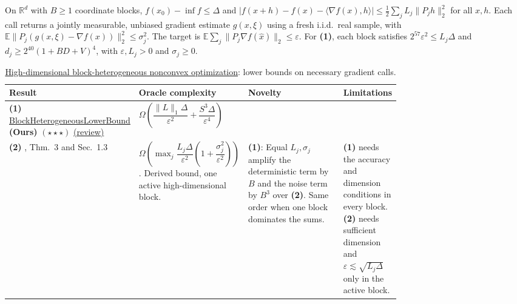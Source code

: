 \begin{table}[tp]
\centering
\caption{\href{https://github.com/k3nfalt/longtails/blob/main/LongTails/Setups/HighDimensionalBlockHeterogeneousNonconvex.lean}{High-dimensional block-heterogeneous nonconvex optimization}: lower bounds on necessary gradient calls.}\label{tab:HighDimensionalBlockHeterogeneousNonconvex}
\parbox{\linewidth}{\footnotesize On $\mathbb R^d$ with $B\ge1$ coordinate blocks, $f(x_0)-\inf f\le\Delta$ and $|f(x+h)-f(x)-\langle\nabla f(x),h\rangle|\le\frac12\sum_j L_j\|P_jh\|_2^2$ for all $x,h$. Each call returns a jointly measurable, unbiased gradient estimate $g(x,\xi)$ using a fresh i.i.d.\ real sample, with $\mathbb E\|P_j(g(x,\xi)-\nabla f(x))\|_2^2\le\sigma_j^2$. The target is $\mathbb E\sum_j\|P_j\nabla f(\hat x)\|_2\le\varepsilon$. For \textbf{(1)}, each block satisfies $2^{57}\varepsilon^2\le L_j\Delta$ and $d_j\ge2^{40}(1+BD+V)^4$, with $\varepsilon,L_j>0$ and $\sigma_j\ge0$.}\par\smallskip
\begin{threeparttable}
\footnotesize
\setlength{\tabcolsep}{4pt}\renewcommand{\arraystretch}{1.25}
\begin{tabularx}{\linewidth}{@{}>{\raggedright\arraybackslash}p{0.20\linewidth}>{\raggedright\arraybackslash}p{0.26\linewidth}>{\raggedright\arraybackslash}p{0.29\linewidth}>{\raggedright\arraybackslash}X@{}}
\toprule
\textbf{Result} & \textbf{Oracle complexity} & \textbf{Novelty} & \textbf{Limitations} \\
\midrule
\textbf{(1)} \href{https://github.com/k3nfalt/longtails/blob/main/LongTails/Theorems/BlockHeterogeneousLowerBound.lean}{Block\allowbreak Heterogeneous\allowbreak Lower\allowbreak Bound} \textbf{(Ours)} $(\star\star\star)$ \href{https://github.com/k3nfalt/longtails/blob/main/scripts/reviews/BlockHeterogeneousLowerBound.md}{(review)}
& $\Omega\!\left(\dfrac{\|L\|_1\Delta}{\varepsilon^2}+\dfrac{S^3\Delta}{\varepsilon^4}\right)$ & & \\
\midrule[1.2pt]
\textbf{(2)} \citep{hdabcArjevaniV2}, Thm.~3 and Sec.~1.3
& $\Omega\!\left(\max_j\dfrac{L_j\Delta}{\varepsilon^2}\!\left(1+\dfrac{\sigma_j^2}{\varepsilon^2}\right)\right)$. Derived bound, one active high-dimensional block.
& \textbf{(1)}: Equal $L_j,\sigma_j$ amplify the deterministic term by $B$ and the noise term by $B^3$ over \textbf{(2)}. Same order when one block dominates the sums.
& \textbf{(1)} needs the accuracy and dimension conditions in every block. \textbf{(2)} needs sufficient dimension and $\varepsilon\lesssim\sqrt{L_j\Delta}$ only in the active block. \\

\end{tabularx}
\end{threeparttable}
\end{table}
